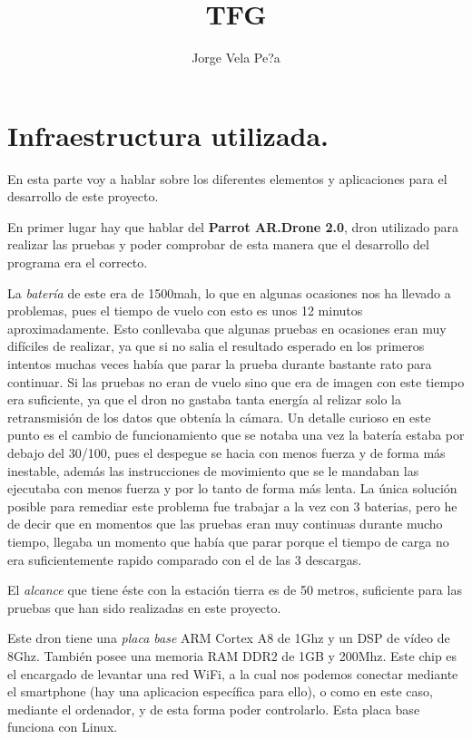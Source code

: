\documentclass{report}
\title{TFG}
\author{Jorge Vela Pe?a}
\begin{document}


\large


\chapter{Infraestructura utilizada.}
En esta parte voy a hablar sobre los diferentes elementos y aplicaciones para el desarrollo de este proyecto.

\hspace{1 cm} En primer lugar hay que hablar del \textbf{Parrot AR.Drone 2.0}, dron utilizado para realizar las pruebas y poder comprobar de esta manera que el desarrollo del programa era el correcto. 

\hspace{1 cm} La \textsl{bater\'ia} de este era de 1500mah, lo que en algunas ocasiones nos ha llevado a problemas, pues el tiempo de vuelo con esto es unos 12 minutos aproximadamente. Esto conllevaba que algunas pruebas en ocasiones eran muy dif\'iciles de realizar, ya que si no salia el resultado esperado en los primeros intentos muchas veces hab\'ia que parar la prueba durante bastante rato para continuar. Si las pruebas no eran de vuelo sino que era de imagen con este tiempo era suficiente, ya que el dron no gastaba tanta energ\'ia al relizar solo la retransmisi\'on de los datos que obten\'ia la c\'amara. Un detalle curioso en este punto es el cambio de funcionamiento que se notaba una vez la bater\'ia estaba por debajo del 30/100, pues el despegue se hacia con menos fuerza y de forma m\'as inestable, adem\'as las instrucciones de movimiento que se le mandaban las ejecutaba con menos fuerza y por lo tanto de forma m\'as lenta. La \'unica soluci\'on posible para remediar este problema fue trabajar a la vez con 3 baterias, pero he de decir que en momentos que las pruebas eran muy continuas durante mucho tiempo, llegaba un momento que hab\'ia que parar porque el tiempo de carga no era suficientemente rapido comparado con el de las 3 descargas. 

\hspace{1 cm} El \textsl{alcance} que tiene \'este con la estaci\'on tierra es de 50 metros, suficiente para las pruebas que han sido realizadas en este proyecto. 

\hspace{1 cm} Este dron tiene una \textsl{placa base} ARM Cortex A8 de 1Ghz y un DSP de v\'ideo de 8Ghz. Tambi\'en posee una memoria RAM DDR2 de 1GB y 200Mhz. Este chip es el encargado de levantar una red WiFi, a la cual nos podemos conectar mediante el smartphone (hay una aplicacion espec\'ifica para ello), o como en este caso, mediante el ordenador, y de esta forma poder controlarlo. Esta placa base funciona con Linux. 
\end{document}
